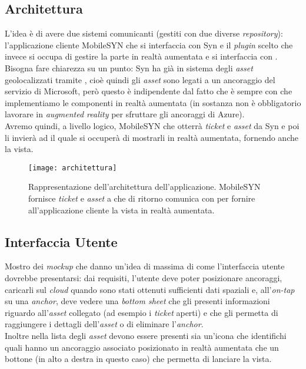 \subsection{Architettura}
L'idea è di avere due sistemi comunicanti (gestiti con due diverse \textit{repository}): l'applicazione cliente MobileSYN che si interfaccia con Syn e il \textit{plugin} scelto che invece si occupa di gestire la parte in realtà aumentata e si interfaccia con \asa{}.\\
Bisogna fare chiarezza su un punto: Syn ha già in sistema degli \textit{asset} geolocalizzati tramite \asa{}, cioè quindi gli \textit{asset} sono legati a un ancoraggio del servizio di Microsoft, però questo è indipendente dal fatto che è sempre con \asa{} che implementiamo le componenti in realtà aumentata (in sostanza non è obbligatorio lavorare in \textit{augmented reality} per sfruttare gli ancoraggi di Azure).\\
Avremo quindi, a livello logico, MobileSYN che otterrà \textit{ticket} e \textit{asset} da Syn e poi li invierà ad \aplug{} il quale si occuperà di mostrarli in realtà aumentata, fornendo anche la vista.

\begin{figure}[H]
  \centering
  \texttt{[image: architettura]}\hfill
  \caption[Architettura \textit{app}]{Rappresentazione dell'architettura dell'applicazione. MobileSYN fornisce \textit{ticket} e \textit{asset} a \aplug{} che di ritorno comunica con \asa{} per fornire all'applicazione cliente la vista in realtà aumentata.}
\end{figure}

\subsection{Interfaccia Utente}
Mostro dei \textit{mockup} che danno un'idea di massima di come l'interfaccia utente dovrebbe presentarsi: dai requisiti, l'utente deve poter posizionare ancoraggi, caricarli sul \textit{cloud} quando sono stati ottenuti sufficienti dati spaziali e, all'\textit{on-tap} su una \textit{anchor}, deve vedere una \textit{bottom sheet} che gli presenti informazioni riguardo all'\textit{asset} collegato (ad esempio i \textit{ticket} aperti) e che gli permetta di raggiungere i dettagli dell'\textit{asset} o di eliminare l'\textit{anchor}.\\
Inoltre nella lista degli \textit{asset} devono essere presenti sia un'icona che identifichi quali hanno un ancoraggio associato posizionato in realtà aumentata che un bottone (in alto a destra in questo caso) che permetta di lanciare la vista.


